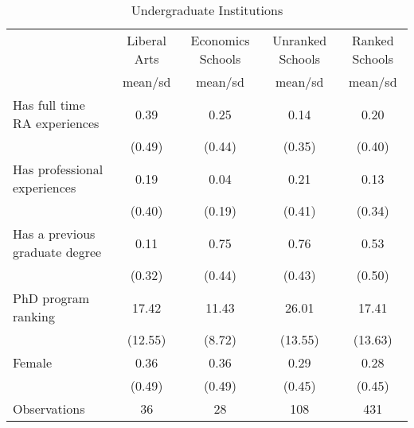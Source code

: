 \begin{table}[htbp]\centering
\def\sym#1{\ifmmode^{#1}\else\(^{#1}\)\fi}
\caption{Undergraduate Institutions}
\begin{tabular}{l*{4}{c}}
\hline\hline
                    &\multicolumn{1}{c}{Liberal Arts}&\multicolumn{1}{c}{Economics Schools}&\multicolumn{1}{c}{Unranked Schools}&\multicolumn{1}{c}{Ranked Schools}\\
                    &     mean/sd&     mean/sd&     mean/sd&     mean/sd\\
\hline
Has full time RA experiences&        0.39&        0.25&        0.14&        0.20\\
                    &      (0.49)&      (0.44)&      (0.35)&      (0.40)\\
Has professional experiences&        0.19&        0.04&        0.21&        0.13\\
                    &      (0.40)&      (0.19)&      (0.41)&      (0.34)\\
Has a previous graduate degree&        0.11&        0.75&        0.76&        0.53\\
                    &      (0.32)&      (0.44)&      (0.43)&      (0.50)\\
PhD program ranking &       17.42&       11.43&       26.01&       17.41\\
                    &     (12.55)&      (8.72)&     (13.55)&     (13.63)\\
Female              &        0.36&        0.36&        0.29&        0.28\\
                    &      (0.49)&      (0.49)&      (0.45)&      (0.45)\\
\hline
Observations        &          36&          28&         108&         431\\
\hline\hline
\end{tabular}
\end{table}
